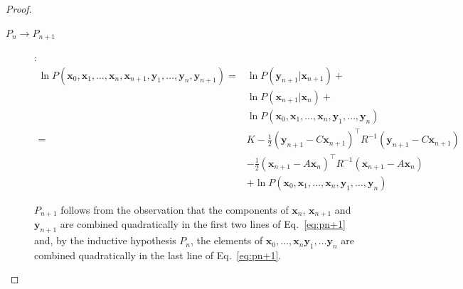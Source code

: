 \documentclass[12pt]{article}
\begin{document}
\begin{proof}
\begin{description}
        \item[$P_n\rightarrow P_{n+1}$]:
            \begin{align}
                \ln P(\mathbf{x}_0, \mathbf{x}_1, \ldots, \mathbf{x}_n, \mathbf{x}_{n+1},\mathbf{y}_1, \ldots, \mathbf{y}_{n}, \mathbf{y}_{n+1})=&\ln P(\mathbf{y}_{n+1}|\mathbf{x}_{n+1})+\nonumber\\
                &\ln P(\mathbf{x}_{n+1}|\mathbf{x}_n)+\nonumber\\
                &\ln P(\mathbf{x}_0,\mathbf{x}_1,\ldots,\mathbf{x}_n,\mathbf{y}_1, \ldots, \mathbf{y}_{n})\nonumber\\
                =&K-\frac{1}{2}(\mathbf{y}_{n+1}-C\mathbf{x}_{n+1})^\intercal R^{-1}(\mathbf{y}_{n+1}-C\mathbf{x}_{n+1})\nonumber\\
                 &-\frac{1}{2}(\mathbf{x}_{n+1}-A\mathbf{x}_{n})^\intercal R^{-1}(\mathbf{x}_{n+1}-A\mathbf{x}_{n})\nonumber\\
                 &+\ln P(\mathbf{x}_0,\mathbf{x}_1,\ldots,\mathbf{x}_n,\mathbf{y}_1, \ldots, \mathbf{y}_{n})\label{eq:pn+1}
            \end{align}

            $P_{n+1}$ follows from the observation that the components of
            $\mathbf{x}_n$, $\mathbf{x}_{n+1}$ and $\mathbf{y}_{n+1}$ are combined
            quadratically in the first two lines of Eq.~\ref{eq:pn+1} and, by
            the inductive hypothesis $P_n$, the elements of
            $\mathbf{x}_0,\ldots,\mathbf{x}_n\mathbf{y}_1,\ldots\mathbf{y}_n$
            are combined quadratically in the last line of Eq.~\ref{eq:pn+1}.

    \end{description}

\end{proof}



\end{document}
